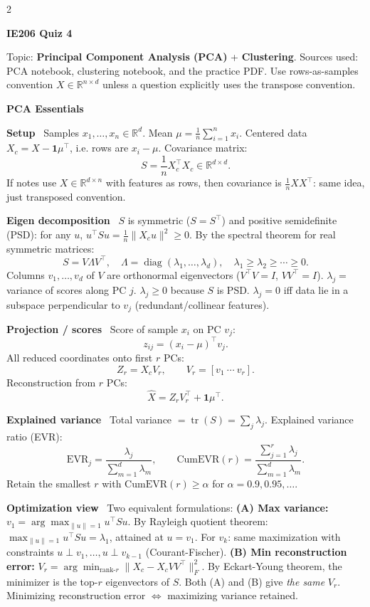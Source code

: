 \documentclass[10pt,fleqn]{article}
\newcommand{\R}{\mathbb{R}}
\newcommand{\shead}[1]{\vspace{0.1ex}\textbf{\scriptsize #1}\par}
\newcommand{\topic}[1]{\textbf{#1}\ }
\DeclareMathOperator{\tr}{tr}
\begin{document}
\fontsize{6.3}{6.65}\selectfont
\sloppy
\raggedright

\begin{multicols*}{2}
\raggedcolumns

\shead{IE206 Quiz 4}
Topic: \textbf{Principal Component Analysis (PCA)} + \textbf{Clustering}. Sources used: PCA notebook, clustering notebook, and the practice PDF. Use rows-as-samples convention \(X\in\R^{n\times d}\) unless a question explicitly uses the transpose convention.

\shead{PCA Essentials}
\topic{Setup} Samples \(x_1,\dots,x_n\in\R^d\). Mean \(\mu=\frac1n\sum_{i=1}^n x_i\). Centered data \(X_c=X-\mathbf 1\mu^\top\), i.e. rows are \(x_i-\mu\). Covariance matrix:
\[
S=\frac1n X_c^\top X_c \in \R^{d\times d}.
\]
If notes use \(X\in\R^{d\times n}\) with features as rows, then covariance is \(\frac1n XX^\top\): same idea, just transposed convention.

\topic{Eigen decomposition} \(S\) is symmetric (\(S=S^\top\)) and positive semidefinite (PSD): for any \(u\), \(u^\top Su = \frac1n\|X_cu\|^2\ge 0\). By the spectral theorem for real symmetric matrices:
\[
S=V\Lambda V^\top,\quad \Lambda=\operatorname{diag}(\lambda_1,\dots,\lambda_d),\quad \lambda_1\ge\lambda_2\ge\cdots\ge 0.
\]
Columns \(v_1,\dots,v_d\) of \(V\) are orthonormal eigenvectors (\(V^\top V=I\), \(VV^\top=I\)). \(\lambda_j=\) variance of scores along PC \(j\). \(\lambda_j\ge 0\) because \(S\) is PSD. \(\lambda_j=0\) iff data lie in a subspace perpendicular to \(v_j\) (redundant/collinear features).

\topic{Projection / scores} Score of sample \(x_i\) on PC \(v_j\):
\[
z_{ij}=(x_i-\mu)^\top v_j.
\]
All reduced coordinates onto first \(r\) PCs:
\[
Z_r=X_cV_r,\qquad V_r=[v_1\ \cdots\ v_r].
\]
Reconstruction from \(r\) PCs:
\[
\widehat X = Z_rV_r^\top+\mathbf 1\mu^\top.
\]

\topic{Explained variance} Total variance \(=\tr(S)=\sum_j\lambda_j\). Explained variance ratio (EVR):
\[
\mathrm{EVR}_j=\frac{\lambda_j}{\sum_{m=1}^d\lambda_m},\qquad
\mathrm{CumEVR}(r)=\frac{\sum_{j=1}^r\lambda_j}{\sum_{m=1}^d\lambda_m}.
\]
Retain the smallest \(r\) with \(\mathrm{CumEVR}(r)\ge \alpha\) for \(\alpha=0.9,0.95,\dots\).

\topic{Optimization view} Two equivalent formulations:
\textbf{(A) Max variance:} \(v_1=\arg\max_{\|u\|=1}u^\top Su\). By Rayleigh quotient theorem: \(\max_{\|u\|=1} u^\top Su = \lambda_1\), attained at \(u=v_1\). For \(v_k\): same maximization with constraints \(u\perp v_1,\dots,u\perp v_{k-1}\) (Courant-Fischer).
\textbf{(B) Min reconstruction error:} \(V_r=\arg\min_{\text{rank-}r} \|X_c - X_c V V^\top\|_F^2\). By Eckart-Young theorem, the minimizer is the top-\(r\) eigenvectors of \(S\). Both (A) and (B) give \emph{the same} \(V_r\). Minimizing reconstruction error \(\Leftrightarrow\) maximizing variance retained.


\end{multicols*}
\end{document}
